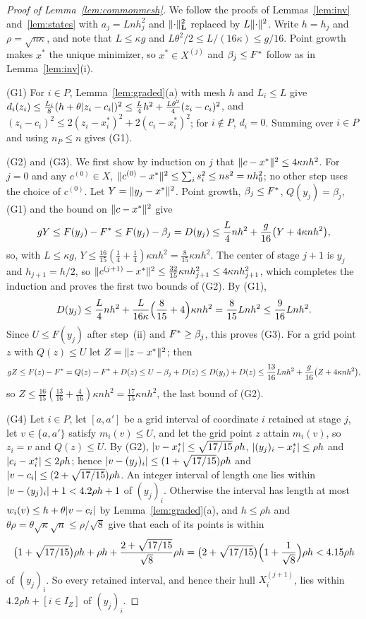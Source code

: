 \begin{proof}[Proof of Lemma~\ref{lem:commonmesh}]
We follow the proofs of Lemmas~\ref{lem:inv} and~\ref{lem:states} with
$a_j=Lnh_j^2$ and $\lVert \cdot\rVert_{\mathbf L}^2$ replaced by $L\lVert \cdot\rVert^2$.
Write $h=h_j$ and $\rho=\sqrt{n\kappa}$, and note that $L\le\kappa g$ and
$L\theta^2/2\le L/(16\kappa)\le g/16$. Point growth makes $x^*$ the unique
minimizer, so $x^*\in X^{(j)}$ and $\beta_j\le F^{*}$ follow as in
Lemma~\ref{lem:inv}(i).

(G1) For $i\in P$, Lemma~\ref{lem:graded}(a) with mesh $h$ and $L_i\le L$ give
$d_i(z_i)\le\frac{L_i}8(h+\theta\lvert z_i-c_i\rvert)^2\le\frac L4h^2
+\frac{L\theta^2}4(z_i-c_i)^2$, and
$(z_i-c_i)^2\le2(z_i-x_i^*)^2+2(c_i-x_i^*)^2$; for $i\notin P$, $d_i=0$.
Summing over $i\in P$ and using $n_P\le n$ gives (G1).

(G2) and (G3). We first show by induction on $j$ that
$\lVert c-x^*\rVert^2\le4\kappa nh^2$. For $j=0$ and any $c^{(0)}\in X$,
$\lVert c^{(0)}-x^*\rVert^2\le\sum_is_i^2\le ns^2=nh_0^2$; no other step uses the
choice of $c^{(0)}$. Let
$Y=\lVert y_j-x^*\rVert^2$. Point growth, $\beta_j\le F^{*}$, $Q(y_j)=\beta_j$, (G1)
and the bound on $\lVert c-x^*\rVert^2$ give
\[
gY\le F(y_j)-F^{*}\le F(y_j)-\beta_j=D(y_j)
\le\frac L4nh^2+\frac g{16}\bigl(Y+4\kappa nh^2\bigr),
\]
so, with $L\le\kappa g$, $Y\le\frac{16}{15}(\frac14+\frac14)\kappa nh^2
=\frac8{15}\kappa nh^2$. The center of stage $j+1$ is $y_j$ and
$h_{j+1}=h/2$, so $\lVert c^{(j+1)}-x^*\rVert^2\le\frac{32}{15}\kappa nh_{j+1}^2
\le4\kappa nh_{j+1}^2$, which completes the induction and proves the first
two bounds of (G2). By (G1),
\[
D(y_j)\le\frac L4nh^2+\frac L{16\kappa}\Bigl(\frac8{15}+4\Bigr)\kappa nh^2
=\frac8{15}Lnh^2\le\frac9{16}Lnh^2 .
\]
Since $U\le F(y_j)$ after step~(ii) and $F^{*}\ge\beta_j$, this proves (G3).
For a grid point $z$ with $Q(z)\le U$ let $Z=\lVert z-x^*\rVert^2$; then
\[
gZ\le F(z)-F^{*}=Q(z)-F^{*}+D(z)\le U-\beta_j+D(z)\le D(y_j)+D(z)
\le\frac{13}{16}Lnh^2+\frac g{16}\bigl(Z+4\kappa nh^2\bigr),
\]
so $Z\le\frac{16}{15}(\frac{13}{16}+\frac4{16})\kappa nh^2
=\frac{17}{15}\kappa nh^2$, the last bound of (G2).

(G4) Let $i\in P$, let $[a,a']$ be a grid interval of coordinate $i$ retained
at stage $j$, let $v\in\{a,a'\}$ satisfy $m_i(v)\le U$, and let the grid
point $z$ attain $m_i(v)$, so $z_i=v$ and $Q(z)\le U$. By (G2),
$\lvert v-x_i^*\rvert\le\sqrt{17/15}\,\rho h$, $\lvert (y_j)_i-x_i^*\rvert\le\rho h$ and
$\lvert c_i-x_i^*\rvert\le2\rho h$; hence
$\lvert v-(y_j)_i\rvert\le(1+\sqrt{17/15})\rho h$ and
$\lvert v-c_i\rvert\le(2+\sqrt{17/15})\rho h$. An integer interval of length one
lies within $\lvert v-(y_j)_i\rvert+1<4.2\rho h+1$ of $(y_j)_i$. Otherwise the
interval has length at most $w_i(v)\le h+\theta\lvert v-c_i\rvert$ by
Lemma~\ref{lem:graded}(a), and $h\le\rho h$ and
$\theta\rho=\theta\sqrt\kappa\sqrt n\le\rho/\sqrt8$ give that each of its
points is within
\[
\bigl(1+\sqrt{17/15}\bigr)\rho h+\rho h+\frac{2+\sqrt{17/15}}{\sqrt8}\rho h
=\bigl(2+\sqrt{17/15}\bigr)\Bigl(1+\frac1{\sqrt8}\Bigr)\rho h<4.15\rho h
\]
of $(y_j)_i$. So every retained interval, and hence their hull
$X_i^{(j+1)}$, lies within $4.2\rho h+[i\in I_Z]$ of $(y_j)_i$.


\end{proof}
